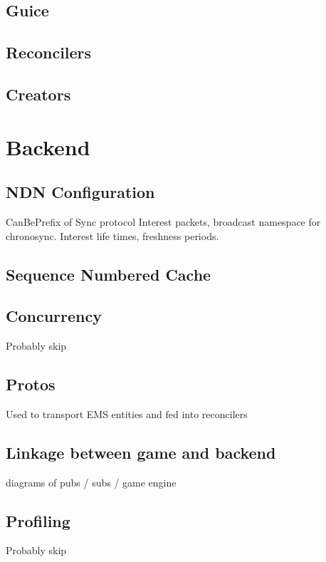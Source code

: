 \subsection{Guice}


\subsection{Reconcilers}


\subsection{Creators}




\section{Backend}

\subsection{NDN Configuration}
CanBePrefix of Sync protocol Interest packets, broadcast namespace for chronosync. Interest life times, freshness periods.

\subsection{Sequence Numbered Cache}


\subsection{Concurrency}
Probably skip


\subsection{Protos}
Used to transport EMS entities and fed into reconcilers

\subsection{Linkage between game and backend}
diagrams of pubs / subs / game engine


\subsection{Profiling}
Probably skip

